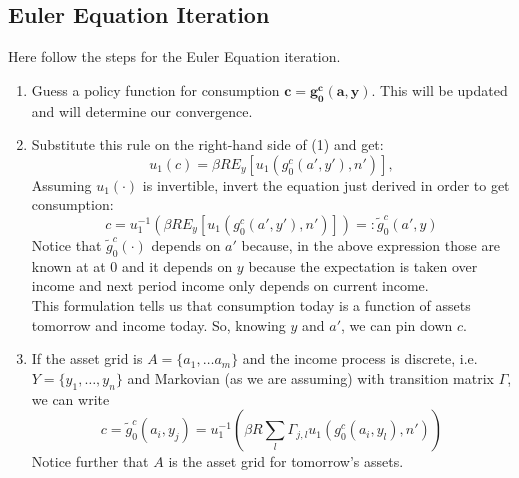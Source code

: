\documentclass[11pt]{article}
\theoremstyle{definition}
\begin{document}
\subsection{Euler Equation Iteration}
Here follow the steps for the Euler Equation iteration.
\begin{enumerate}
	\item Guess a policy function for consumption $\bm{c=g_{0}^{c}(a,y)}$. This will be updated and will determine our convergence.
	\item Substitute this rule on the right-hand side of (1) and get:
	$$u_{1}(c)=\beta R E_{y}\left[u_{1}(g_{0}^{c}(a',y'),n')\right],$$
	Assuming $u_{1}(\cdot)$ is invertible, invert the equation just derived in order to get consumption:
	$$c = u_{1}^{-1}\left( \beta R E_{y}\left[u_{1}(g_{0}^{c}(a',y'),n')\right] \right)=:\tilde{g}_{0}^{c}(a',y)$$
	Notice that $\tilde{g}_{0}^{c}(\cdot)$ depends on $a'$ because, in the above expression those are known at at $0$ and it depends on $y$ because the expectation is taken over income and next period income only depends on current income.\\
	This formulation tells us that consumption today is a function of assets tomorrow and income today. So, knowing $y$ and $a'$, we can pin down $c$.
	\item If the asset grid is $A =\{a_{1},\dots a_{m}\}$ and the income process is discrete, i.e. $Y=\{y_{1},\dots,y_{n}\}$ and Markovian (as we are assuming) with transition matrix $\Gamma$, we can write
	$$c =\tilde{g}_{0}^{c}(a_{i},y_{j})= u_{1}^{-1}\left( \beta R \sum_{l} \Gamma_{j,l} u_{1}(g_{0}^{c}(a_{i},y_{l}),n')\right)$$
	Notice further that $A$ is the asset grid for tomorrow's assets.\\
	

\end{enumerate}
\end{document}
